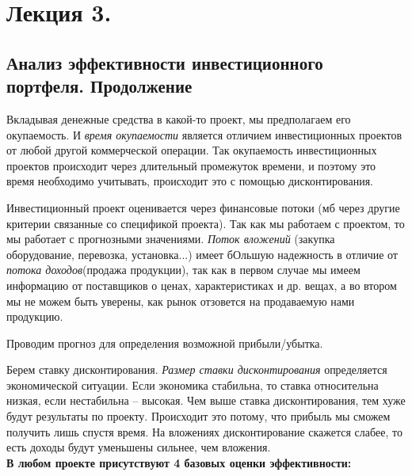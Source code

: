 \documentclass[reqno]{article}
\theoremstyle{definition}
\theoremstyle{definition}
\theoremstyle{definition}
\theoremstyle{definition}
\theoremstyle{definition}
\theoremstyle{definition}
\theoremstyle{definition}
\theoremstyle{definition}
\theoremstyle{definition}
\begin{document}
	
	\newpage
	\section{Лекция 3.}
	\subsection{Анализ эффективности инвестиционного портфеля. Продолжение}
	
	Вкладывая денежные средства в какой-то проект, мы предполагаем его окупаемость. И \emph{время окупаемости} является отличием инвестиционных проектов от любой другой коммерческой операции. Так окупаемость инвестиционных проектов происходит через длительный промежуток времени, и поэтому это время необходимо учитывать, происходит это с помощью дисконтирования. 
	
	Инвестиционный проект  оценивается через финансовые потоки (мб через другие критерии связанные со спецификой проекта). Так как мы работаем с проектом, то мы работает с прогнозными значениями. \emph{Поток вложений} (закупка оборудование, перевозка, установка...) имеет бОльшую надежность в отличие от \emph{потока доходов}(продажа продукции), так как в первом случае мы имеем информацию от поставщиков о ценах, характеристиках и др. вещах, а во втором мы не можем быть уверены, как рынок отзовется на продаваемую нами продукцию.
	
	Проводим прогноз для определения возможной прибыли/убытка.
	
	Берем ставку дисконтирования. \emph{Размер ставки дисконтирования} определяется экономической ситуации. Если экономика стабильна, то ставка относительна низкая, если нестабильна -- высокая. Чем выше ставка дисконтирования, тем хуже будут результаты по проекту. Происходит это потому, что прибыль мы сможем получить лишь спустя время. На вложениях дисконтирование скажется слабее, то есть доходы будут уменьшены сильнее, чем вложения. \\
	
	\textbf{В любом проекте присутствуют 4 базовых оценки эффективности:}
	
\end{document}
